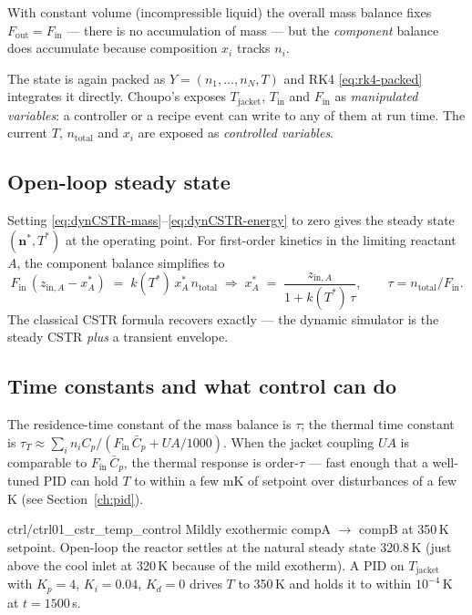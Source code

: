 \documentclass[11pt,a4paper]{article}
\newcommand{\nv}{\mathbf{n}}                          %
\begin{document}
With constant volume (incompressible liquid) the overall mass
balance fixes $F_{\mathrm{out}} = F_{\mathrm{in}}$ --- there is no
accumulation of mass --- but the \emph{component} balance does
accumulate because composition $x_i$ tracks $n_i$.

The state is again packed as $Y = (n_1, \ldots, n_N, T)$ and RK4
\eqref{eq:rk4-packed} integrates it directly.  Choupo's
 exposes $T_{\mathrm{jacket}}$, $T_{\mathrm{in}}$
and $F_{\mathrm{in}}$ as \emph{manipulated variables}: a controller
or a recipe event can write to any of them at run time.  The current
$T$, $n_{\mathrm{total}}$ and $x_i$ are exposed as
\emph{controlled variables}.

\subsection*{Open-loop steady state}

Setting \eqref{eq:dynCSTR-mass}--\eqref{eq:dynCSTR-energy} to zero
gives the steady state $(\nv^{*}, T^{*})$ at the operating point.
For first-order kinetics in the limiting reactant $A$, the
component balance simplifies to
\[
    F_{\mathrm{in}}\,(z_{\mathrm{in},A} - x_A^{*})
    \;=\; k(T^{*})\, x_A^{*}\, n_{\mathrm{total}}
    \;\Longrightarrow\;
    x_A^{*}
    \;=\; \frac{z_{\mathrm{in},A}}{1 + k(T^{*})\,\tau},
    \qquad
    \tau = n_{\mathrm{total}} / F_{\mathrm{in}}.
\]
The classical CSTR formula recovers exactly --- the dynamic
simulator is the steady CSTR \emph{plus} a transient envelope.

\subsection*{Time constants and what control can do}

The residence-time constant of the mass balance is $\tau$; the
thermal time constant is $\tau_T \approx \sum_i n_i C_p /
(F_{\mathrm{in}}\,\bar{C}_p + U A / 1000)$.  When the jacket
coupling $U A$ is comparable to $F_{\mathrm{in}}\,\bar{C}_p$, the
thermal response is order-$\tau$ — fast enough that a well-tuned
PID can hold $T$ to within a few mK of setpoint over disturbances
of a few K (see Section~\ref{ch:pid}).

\begin{tutoriallink}{ctrl/ctrl01\_cstr\_temp\_control}
Mildly exothermic compA $\to$ compB at 350\,K setpoint.  Open-loop
the reactor settles at the natural steady state 320.8\,K (just
above the cool inlet at 320\,K because of the mild exotherm).  A
PID on $T_{\mathrm{jacket}}$ with $K_p = 4$, $K_i = 0.04$, $K_d = 0$
drives $T$ to 350\,K and holds it to within $10^{-4}$\,K at
$t = 1500$\,s.
\end{tutoriallink}
\end{document}
